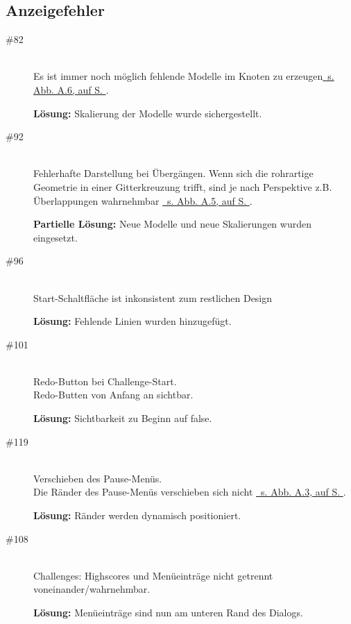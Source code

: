 %



\clearpage



\label{Anhang:Anzeigefehler}



\subsection*{Anzeigefehler}



\begin{description}


\item[\#82] \hfill \\
Es ist immer noch möglich \glqq fehlende Modelle im Knoten zu erzeugen\grqq \hyperref[Anhang:Grafikfehler:Loechrige_Uebergaenge]{\mousecursor~s. Abb. A.6, auf S. \pageref{Anhang:Grafikfehler:Loechrige_Uebergaenge}}.

{\bfseries Lösung:} Skalierung der Modelle wurde sichergestellt.


\item[\#92] \hfill \\
Fehlerhafte Darstellung bei Übergängen. Wenn sich die rohrartige Geometrie in einer Gitterkreuzung trifft, sind je nach Perspektive z.B. Überlappungen wahrnehmbar \hyperref[Anhang:Grafikfehler:Ueberlappung_am_Uebergang]{\mousecursor~s. Abb. A.5, auf S. \pageref{Anhang:Grafikfehler:Ueberlappung_am_Uebergang}}.

{\bfseries Partielle Lösung:} Neue Modelle und neue Skalierungen wurden eingesetzt.


\item[\#96] \hfill \\
\glqq Start\grqq-Schaltfläche ist inkonsistent zum restlichen Design

{\bfseries Lösung:} Fehlende Linien wurden hinzugefügt.


\item[\#101] \hfill \\
Redo-Button bei Challenge-Start.\\
Redo-Butten von Anfang an sichtbar.
 
{\bfseries Lösung:} Sichtbarkeit zu Beginn auf \glqq false\grqq.


\item[\#119] \hfill \\
Verschieben des Pause-Menüs. \\
Die Ränder des Pause-Menüs verschieben sich nicht \hyperref[Anhang:Grafikfehler:Fenster_Schieben]{\mousecursor~s. Abb. A.3, auf S. \pageref{Anhang:Grafikfehler:Fenster_Schieben}}.

{\bfseries Lösung:} Ränder werden dynamisch positioniert. 


\item[\#108] \hfill \\
Challenges: Highscores und Menüeinträge nicht getrennt voneinander/wahrnehmbar.
 
{\bfseries Lösung:} Menüeinträge sind nun am unteren Rand des Dialogs.
 
 
\end{description}



~\\


